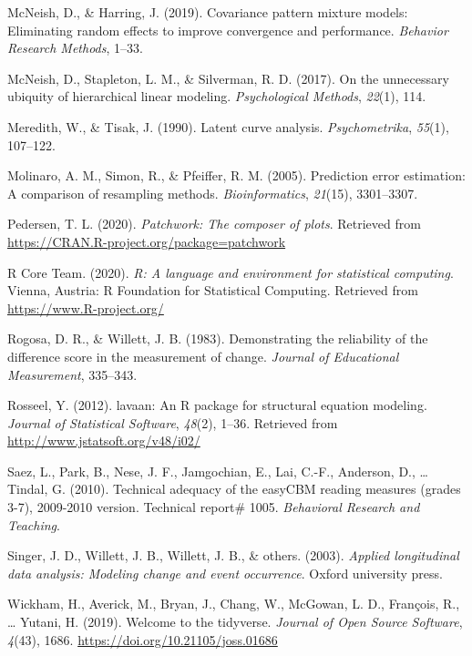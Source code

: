 \documentclass[
  english,
  man, fleqn, noextraspace]{apa6}
\begin{document}
\leavevmode\hypertarget{ref-mcneish2019}{}%
McNeish, D., \& Harring, J. (2019). Covariance pattern mixture models: Eliminating random effects to improve convergence and performance. \emph{Behavior Research Methods}, 1--33.

\leavevmode\hypertarget{ref-mcneishetal2017}{}%
McNeish, D., Stapleton, L. M., \& Silverman, R. D. (2017). On the unnecessary ubiquity of hierarchical linear modeling. \emph{Psychological Methods}, \emph{22}(1), 114.

\leavevmode\hypertarget{ref-meredithtisak1990}{}%
Meredith, W., \& Tisak, J. (1990). Latent curve analysis. \emph{Psychometrika}, \emph{55}(1), 107--122.

\leavevmode\hypertarget{ref-molinaro2005}{}%
Molinaro, A. M., Simon, R., \& Pfeiffer, R. M. (2005). Prediction error estimation: A comparison of resampling methods. \emph{Bioinformatics}, \emph{21}(15), 3301--3307.

\leavevmode\hypertarget{ref-patchwork}{}%
Pedersen, T. L. (2020). \emph{Patchwork: The composer of plots}. Retrieved from \url{https://CRAN.R-project.org/package=patchwork}

\leavevmode\hypertarget{ref-R-base}{}%
R Core Team. (2020). \emph{R: A language and environment for statistical computing}. Vienna, Austria: R Foundation for Statistical Computing. Retrieved from \url{https://www.R-project.org/}

\leavevmode\hypertarget{ref-rogosaetal1983}{}%
Rogosa, D. R., \& Willett, J. B. (1983). Demonstrating the reliability of the difference score in the measurement of change. \emph{Journal of Educational Measurement}, 335--343.

\leavevmode\hypertarget{ref-lavaan}{}%
Rosseel, Y. (2012). lavaan: An R package for structural equation modeling. \emph{Journal of Statistical Software}, \emph{48}(2), 1--36. Retrieved from \url{http://www.jstatsoft.org/v48/i02/}

\leavevmode\hypertarget{ref-saez2010tech}{}%
Saez, L., Park, B., Nese, J. F., Jamgochian, E., Lai, C.-F., Anderson, D., \ldots{} Tindal, G. (2010). Technical adequacy of the easyCBM reading measures (grades 3-7), 2009-2010 version. Technical report\# 1005. \emph{Behavioral Research and Teaching}.

\leavevmode\hypertarget{ref-singerwillett2003}{}%
Singer, J. D., Willett, J. B., Willett, J. B., \& others. (2003). \emph{Applied longitudinal data analysis: Modeling change and event occurrence}. Oxford university press.

\leavevmode\hypertarget{ref-tidyverse}{}%
Wickham, H., Averick, M., Bryan, J., Chang, W., McGowan, L. D., François, R., \ldots{} Yutani, H. (2019). Welcome to the tidyverse. \emph{Journal of Open Source Software}, \emph{4}(43), 1686. \url{https://doi.org/10.21105/joss.01686}
\end{document}
